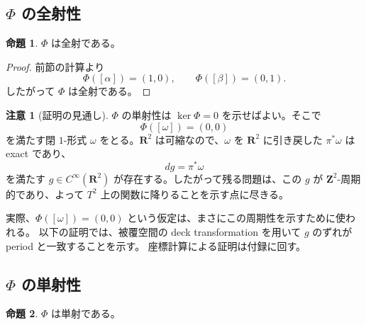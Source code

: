 \documentclass[uplatex,dvipdfmx,11pt]{jsarticle}
\newcommand{\R}{\mathbf{R}}
\newcommand{\Z}{\mathbf{Z}}
\theoremstyle{definition}
\newtheorem{prop}{命題}
\newtheorem{remark}{注意}
\begin{document}
\subsection{\(\Phi\) の全射性}

\begin{prop}
\(\Phi\) は全射である。
\end{prop}

\begin{proof}
前節の計算より
\[
\Phi([\alpha])=(1,0),\qquad \Phi([\beta])=(0,1).
\]
したがって \(\Phi\) は全射である。
\end{proof}

\begin{remark}[証明の見通し]
\(\Phi\) の単射性は \(\ker \Phi=0\) を示せばよい。そこで
\[
\Phi([\omega])=(0,0)
\]
を満たす閉 $1$-形式 \(\omega\) をとる。\(\R^2\) は可縮なので、\(\omega\) を
\(\R^2\) に引き戻した \(\pi^*\omega\) は exact であり、
\[
dg=\pi^*\omega
\]
を満たす \(g\in C^\infty(\R^2)\) が存在する。したがって残る問題は、この
\(g\) が \(\Z^2\)-周期的であり、よって \(T^2\) 上の関数に降りることを示す点に尽きる。

\medskip

実際、\(\Phi([\omega])=(0,0)\) という仮定は、まさにこの周期性を示すために使われる。
以下の証明では、被覆空間の deck transformation を用いて
\(g\) のずれが period と一致することを示す。
座標計算による証明は付録に回す。
\end{remark}


\subsection{\(\Phi\) の単射性}

\begin{prop}
\(\Phi\) は単射である。
\end{prop}
\end{document}
